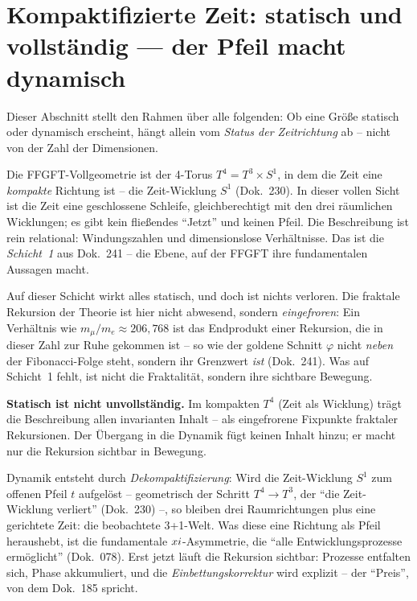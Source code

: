 \section{Kompaktifizierte Zeit: statisch und vollständig --- der Pfeil macht dynamisch}
\label{sec:rahmen}

Dieser Abschnitt stellt den Rahmen über alle folgenden: Ob eine Größe statisch
oder dynamisch erscheint, hängt allein vom \emph{Status der Zeitrichtung} ab --
nicht von der Zahl der Dimensionen.

Die FFGFT-Vollgeometrie ist der 4-Torus $T^4 = T^3 \times S^1$, in dem die Zeit
eine \emph{kompakte} Richtung ist -- die Zeit-Wicklung $S^1$ (Dok.~230). In dieser
vollen Sicht ist die Zeit eine geschlossene Schleife, gleichberechtigt mit den
drei räumlichen Wicklungen; es gibt kein fließendes ``Jetzt'' und keinen Pfeil.
Die Beschreibung ist rein relational: Windungszahlen und dimensionslose
Verhältnisse. Das ist die \emph{Schicht~1} aus Dok.~241 -- die Ebene, auf der
FFGFT ihre fundamentalen Aussagen macht.

Auf dieser Schicht wirkt alles statisch, und doch ist nichts verloren. Die
fraktale Rekursion der Theorie ist hier nicht abwesend, sondern \emph{eingefroren}:
Ein Verhältnis wie $m_\mu/m_e \approx 206{,}768$ ist das Endprodukt einer
Rekursion, die in dieser Zahl zur Ruhe gekommen ist -- so wie der goldene Schnitt
$\varphi$ nicht \emph{neben} der Fibonacci-Folge steht, sondern ihr Grenzwert
\emph{ist} (Dok.~241). Was auf Schicht~1 fehlt, ist nicht die Fraktalität, sondern
ihre sichtbare Bewegung.

\begin{prinzip}
\textbf{Statisch ist nicht unvollständig.} Im kompakten $T^4$ (Zeit als Wicklung)
trägt die Beschreibung allen invarianten Inhalt -- als eingefrorene Fixpunkte
fraktaler Rekursionen. Der Übergang in die Dynamik fügt keinen Inhalt hinzu; er
macht nur die Rekursion sichtbar in Bewegung.
\end{prinzip}

Dynamik entsteht durch \emph{Dekompaktifizierung}: Wird die Zeit-Wicklung $S^1$ zum
offenen Pfeil $t$ aufgelöst -- geometrisch der Schritt $T^4 \to T^3$, der ``die
Zeit-Wicklung verliert'' (Dok.~230) --, so bleiben drei Raumrichtungen plus eine
gerichtete Zeit: die beobachtete 3+1-Welt. Was diese eine Richtung als Pfeil
heraushebt, ist die fundamentale $xi$-Asymmetrie, die ``alle
Entwicklungsprozesse ermöglicht'' (Dok.~078). Erst jetzt läuft die Rekursion
sichtbar: Prozesse entfalten sich, Phase akkumuliert, und die
\emph{Einbettungskorrektur} wird explizit -- der ``Preis'', von dem Dok.~185
spricht.

